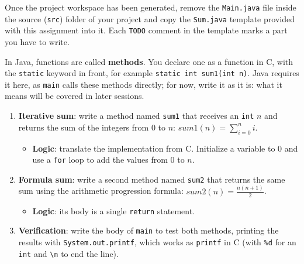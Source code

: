 Once the project workspace has been generated, remove the \texttt{Main.java} file inside the source (\texttt{src}) folder of your project and copy the \texttt{Sum.java} template provided with this assignment into it. Each \texttt{TODO} comment in the template marks a part you have to write.

In Java, functions are called \textbf{methods}. You declare one as a function in C, with the \texttt{static} keyword in front, for example \texttt{static int sum1(int n)}. Java requires it here, as \texttt{main} calls these methods directly; for now, write it as it is: what it means will be covered in later sessions.

\begin{enumerate}

    \item \textbf{Iterative sum}: write a method named \texttt{sum1} that receives an \texttt{int} \(n\) and returns the sum of the integers from \(0\) to \(n\): \(sum1(n) = \sum_{i = 0}^{n} i\).

        \begin{itemize}

            \item \textbf{Logic}: translate the implementation from C. Initialize a variable to \(0\) and use a \texttt{for} loop to add the values from \(0\) to \(n\).

        \end{itemize}

    \item \textbf{Formula sum}: write a second method named \texttt{sum2} that returns the same sum using the arithmetic progression formula: \(sum2(n) = \frac{n(n + 1)}{2}\).

        \begin{itemize}

            \item \textbf{Logic}: its body is a single \texttt{return} statement.

        \end{itemize}

    \item \textbf{Verification}: write the body of \texttt{main} to test both methods, printing the results with \texttt{System.out.printf}, which works as \texttt{printf} in C (with \texttt{\%d} for an \texttt{int} and \texttt{\textbackslash{}n} to end the line).

        \begin{enumerate}


\end{enumerate}
\end{enumerate}
